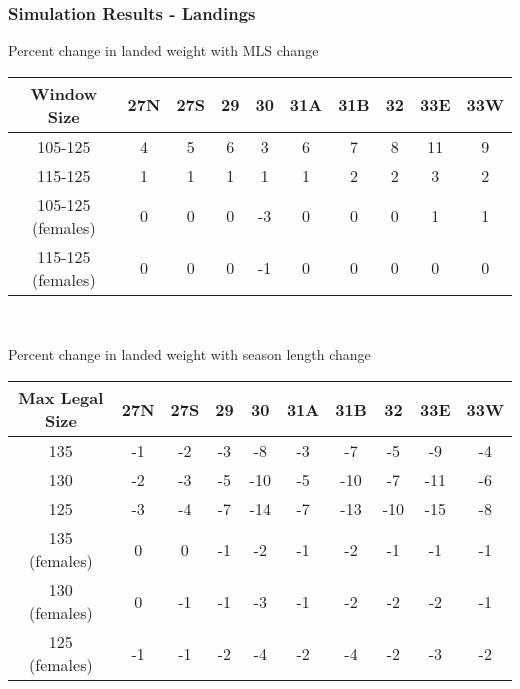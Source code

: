 \documentclass{beamer}
\begin{document}
\begin{frame}
\frametitle{Simulation Results - Landings}
Percent change in  landed weight  with MLS change 
\centering
\begin{tabular}{|c|c|c|c|c|c|c|c|c|c|}
\hline
Window Size       & 27N & 27S & 29 & 30 & 31A & 31B & 32 & 33E & 33W \\
\hline
105-125           & 4 & 5 & 6 & 3 & 6 & 7 & 8 & 11 & 9 \\
\hline
115-125           & 1 & 1 & 1 & 1 & 1 & 2 & 2 & 3 & 2 \\
\hline
105-125 (females)  & 0 & 0 & 0 & -3 & 0 & 0 & 0 & 1 & 1 \\
\hline
115-125 (females)  & 0 & 0 & 0 & -1 & 0 & 0 & 0 & 0 & 0 \\
\hline
 
\end{tabular}\\
\vspace{5mm}

Percent change in  landed weight with season length change 
\centering
\begin{tabular}{|c|c|c|c|c|c|c|c|c|c|}
\hline
Max Legal Size & 27N & 27S & 29 & 30 & 31A & 31B & 32 & 33E & 33W \\
\hline
135            & -1 & -2 & -3 & -8 & -3 & -7 & -5 & -9 & -4 \\
\hline
130            & -2 & -3 & -5 & -10 & -5 & -10 & -7 & -11 & -6 \\
\hline
125            & -3 & -4 & -7 & -14 & -7 & -13 & -10 & -15 & -8 \\
\hline
135 (females)  & 0 & 0 & -1 & -2 & -1 & -2 & -1 & -1 & -1 \\
\hline
130 (females)  & 0 & -1 & -1 & -3 & -1 & -2 & -2 & -2 & -1 \\
\hline
125 (females)   & -1 & -1 & -2 & -4 & -2 & -4 & -2 & -3 & -2 \\
\hline
 
 
\end{tabular}
\end{frame}
 
\end{document}
